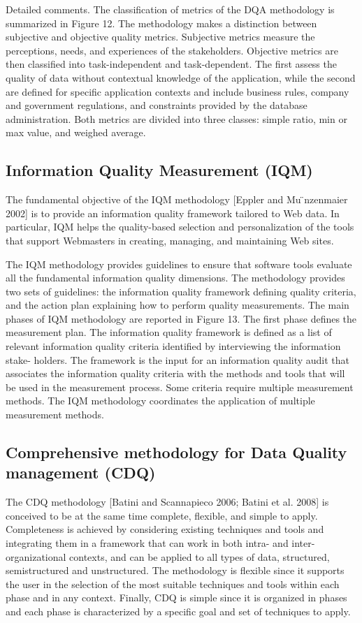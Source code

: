 \documentclass[pdftex,english,oribibl]{llncs}
\begin{document}
    Detailed comments. The classification of metrics of the DQA methodology is summarized in Figure 12. The methodology makes a distinction between subjective and objective quality metrics. Subjective metrics measure the perceptions, needs, and experiences of the stakeholders. Objective metrics are then classified into task-independent and task-dependent. The first assess the quality of data without contextual knowledge of the application, while the second are defined for specific application contexts and include business rules, company and government regulations, and constraints provided by the database administration. Both metrics are divided into three classes: simple ratio, min or max value, and weighed average.


    \subsection{Information Quality Measurement (IQM)}
    The fundamental objective of the IQM methodology [Eppler and Mu ̈nzenmaier 2002] is to provide an information quality framework tailored to Web data.
    In particular, IQM helps the quality-based selection and personalization of the tools that support Webmasters in creating, managing, and maintaining Web sites.

    The IQM methodology provides guidelines to ensure that software tools evaluate all the fundamental information quality dimensions.
    The methodology provides two sets of guidelines: the information quality framework defining quality criteria, and the action plan explaining how to perform quality measurements.
    The main phases of IQM methodology are reported in Figure 13. The first phase defines the measurement plan.
    The information quality framework is defined as a list of relevant information quality criteria identified by interviewing the information stake- holders.
    The framework is the input for an information quality audit that associates the information quality criteria with the methods and tools that will be used in the measurement process.
    Some criteria require multiple measurement methods. The IQM methodology coordinates the application of multiple measurement methods.

    \subsection{Comprehensive methodology for Data Quality management (CDQ)}

    The CDQ methodology [Batini and Scannapieco 2006; Batini et al. 2008] is conceived to be at the same time complete, flexible, and simple to apply.
    Completeness is achieved by considering existing techniques and tools and integrating them in a framework that can work in both intra- and inter-organizational contexts, and can be applied to all types of data, structured, semistructured and unstructured.
    The methodology is flexible since it supports the user in the selection of the most suitable techniques and tools within each phase and in any context.
    Finally, CDQ is simple since it is organized in phases and each phase is characterized by a specific goal and set of techniques to apply.
\end{document}
